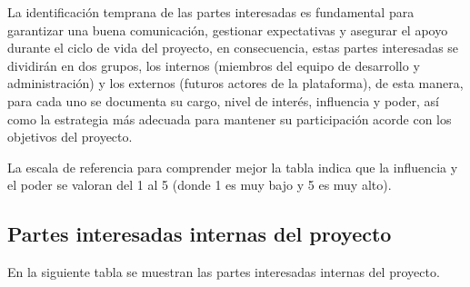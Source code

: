 \documentclass[11pt,spanish]{article}
\begin{document}
La identificación temprana de las partes interesadas es fundamental para garantizar una buena comunicación, gestionar expectativas y asegurar el apoyo durante el ciclo de vida del proyecto, en consecuencia, estas partes interesadas se dividirán en dos grupos, los internos (miembros del equipo de desarrollo y administración) y los externos (futuros actores de la plataforma), de esta manera, para cada uno se documenta su cargo, nivel de interés, influencia y poder, así como la estrategia más adecuada para mantener su participación acorde con los objetivos del proyecto.

La escala de referencia para comprender mejor la tabla indica que la influencia y el poder se valoran del 1 al 5 (donde 1 es muy bajo y 5 es muy alto).

\subsection{Partes interesadas internas del proyecto}

En la siguiente tabla se muestran las partes interesadas internas del proyecto.
\end{document}
